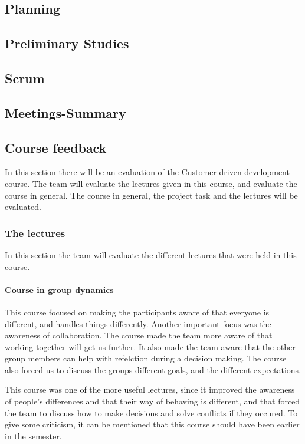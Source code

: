 \subsection{Planning}
\subsection{Preliminary Studies}
\subsection{Scrum}
\subsection{Meetings-Summary}
\subsection{Course feedback}
In this section there will be an evaluation of the Customer driven development course. The team will evaluate the lectures given in this course, and evaluate the course in general.
The course in general, the project task and the lectures will be evaluated.

\subsubsection{The lectures}
In this section the team will evaluate the different lectures that were held in this course.

\paragraph{Course in group dynamics}
This course focused on making the participants aware of that everyone is different, and handles things differently. Another important focus was the awareness of collaboration. The course made the team more aware of that working together will get us further. It also made the team aware that the other group members can help with refelction during a decision making. The course also forced us to discuss the groups different goals, and the different expectations. 

This course was one of the more useful lectures, since it improved the awareness of people's differences
and that their way of behaving is different, and that forced the team to discuss how to make decisions and solve conflicts if they occured. To give some criticism, it can be mentioned that this course should have been earlier in the semester.

